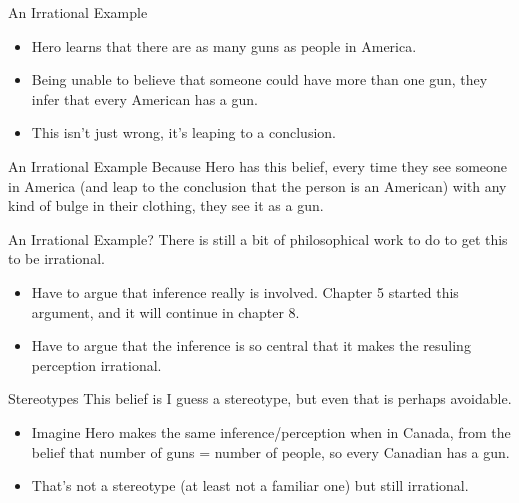 \documentclass[
  17pt,
  letterpaper,
  ignorenonframetext,
  aspectratio=169,
  handout,
  xcolor={dvipsnames}]{beamer}
\providecommand{\tightlist}{%
  \setlength{\itemsep}{0pt}\setlength{\parskip}{0pt}}\usepackage{longtable,booktabs,array}
\begin{document}
\begin{frame}{An Irrational Example}
\protect\hypertarget{an-irrational-example}{}
\begin{itemize}[<+->]
\tightlist
\item
  Hero learns that there are as many guns as people in America.
\item
  Being unable to believe that someone could have more than one gun,
  they infer that every American has a gun.
\item
  This isn't just wrong, it's leaping to a conclusion.
\end{itemize}
\end{frame}

\begin{frame}{An Irrational Example}
\protect\hypertarget{an-irrational-example-1}{}
Because Hero has this belief, every time they see someone in America
(and leap to the conclusion that the person is an American) with any
kind of bulge in their clothing, they see it as a gun.
\end{frame}

\begin{frame}{An Irrational Example?}
\protect\hypertarget{an-irrational-example-2}{}
There is still a bit of philosophical work to do to get this to be
irrational.

\begin{itemize}[<+->]
\tightlist
\item
  Have to argue that inference really is involved. Chapter 5 started
  this argument, and it will continue in chapter 8.
\item
  Have to argue that the inference is so central that it makes the
  resuling perception irrational.
\end{itemize}
\end{frame}

\begin{frame}{Stereotypes}
\protect\hypertarget{stereotypes}{}
This belief is I guess a stereotype, but even that is perhaps avoidable.

\begin{itemize}[<+->]
\tightlist
\item
  Imagine Hero makes the same inference/perception when in Canada, from
  the belief that number of guns = number of people, so every Canadian
  has a gun.
\item
  That's not a stereotype (at least not a familiar one) but still
  irrational.
\end{itemize}
\end{frame}
\end{document}
